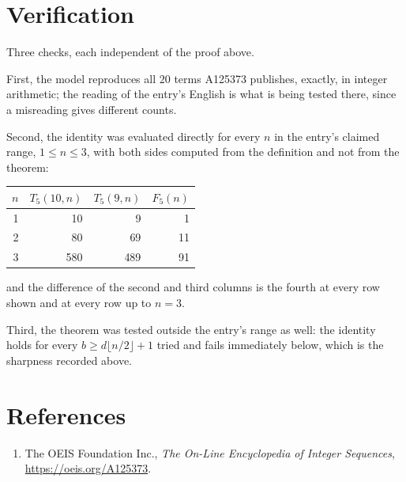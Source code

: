\documentclass[11pt,a4paper]{article}
\theoremstyle{plain}
\theoremstyle{definition}
\begin{document}
\section{Verification}

Three checks, each independent of the proof above.

First, the model reproduces all $20$ terms A125373 publishes, exactly, in integer
arithmetic; the reading of the entry's English is what is being tested there, since a
misreading gives different counts.

Second, the identity was evaluated directly for every $n$ in the entry's claimed range,
$1\le n\le3$, with both sides computed from the definition and not from the theorem:

\begin{center}
\begin{tabular}{rrrr}
$n$ & $T_{5}(10,n)$ & $T_{5}(9,n)$ & $F_{5}(n)$ \\ \hline
1 & 10 & 9 & 1 \\
2 & 80 & 69 & 11 \\
3 & 580 & 489 & 91 \\
\end{tabular}
\end{center}

\noindent and the difference of the second and third columns is the fourth at every row shown
and at every row up to $n=3$.

Third, the theorem was tested outside the entry's range as well: the identity holds for every
$b\ge d\lfloor n/2\rfloor+1$ tried and fails immediately below, which is the sharpness recorded
above.

\section*{References}
\begin{enumerate}
\item The OEIS Foundation Inc., \emph{The On-Line Encyclopedia of Integer Sequences},
\url{https://oeis.org/A125373}.
\end{enumerate}
\end{document}
